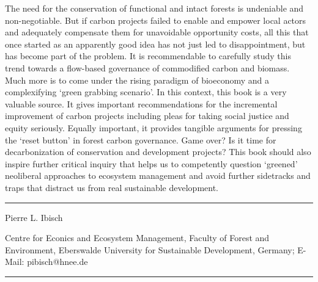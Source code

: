 \documentclass[10pt,a4paper]{article}
\begin{document}
\begin{multicols}{2}
The need for the conservation of functional and intact forests is undeniable and non-negotiable. But if carbon projects failed to enable and empower local actors and adequately compensate them for unavoidable opportunity costs, all this that once started as an apparently good idea has not just led to disappointment, but has become part of the problem. It is recommendable to carefully study this trend towards a flow-based governance of commodified carbon and biomass. Much more is to come under the rising paradigm of bioeconomy and a complexifying `green grabbing scenario'. In this context, this book is a very valuable source. It gives important recommendations for the incremental improvement of carbon projects including pleas for taking social justice and equity seriously. Equally important, it provides tangible arguments for pressing the `reset button' in forest carbon governance. Game over? Is it time for decarbonization of conservation and development projects? This book should also inspire further critical inquiry that helps us to competently question `greened' neoliberal approaches to ecosystem management and avoid further sidetracks and traps that distract us from real sustainable development. 


\setlength{\parindent}{0cm}
\rule{\columnwidth \color{librelloCOLOR}}{1pt}

Pierre L. Ibisch

Centre for Econics and Ecosystem Management, Faculty of Forest and Environment, Eberswalde University for Sustainable Development, Germany; E-Mail: pibisch@hnee.de

\rule{\columnwidth \color{librelloCOLOR}}{1pt}
\vspace{18pt}
\end{multicols}
\end{document}
